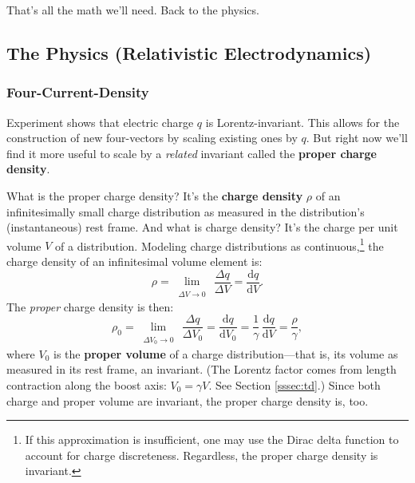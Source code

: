 \documentclass[12pt]{article}
\newcommand{\dd}[1]{\mathrm{d}#1}
\begin{document}
That's all the math we'll need. Back to the physics.



\subsection{The Physics (Relativistic Electrodynamics)}

\subsubsection{Four-Current-Density}

Experiment shows that electric charge $q$ is Lorentz-invariant. This allows for the construction of new four-vectors by scaling existing ones by $q$. But right now we'll find it more useful to scale by a \emph{related} invariant called the \textbf{proper charge density}.

What is the proper charge density? It's the \textbf{charge density} $\rho$ of an infinitesimally small charge distribution as measured in the distribution's (instantaneous) rest frame. And what is charge density? It's the charge per unit volume $V$ of a distribution. Modeling charge distributions as continuous,\footnote{If this approximation is insufficient, one may use the Dirac delta function to account for charge discreteness. Regardless, the proper charge density is invariant.} the charge density of an infinitesimal volume element is:
\begin{equation*}
\rho = \lim\limits_{\substack{\\ \Delta V \to 0}} \, \dfrac{\Delta q}{\Delta V} = \dfrac{\dd q}{\dd V} .
\end{equation*}
The \emph{proper} charge density is then:
\begin{equation*}
\rho_0 = \lim\limits_{\substack{\\ \Delta V_0 \to 0}} \, \dfrac{\Delta q}{\Delta V_0} = \dfrac{\dd q}{\dd V_0} = \dfrac{1}{\gamma} \, \dfrac{\dd q}{\dd V} = \dfrac{\rho}{\gamma},
\end{equation*}
where $V_0$ is the \textbf{proper volume} of a charge distribution---that is, its volume as measured in its rest frame, an invariant. (The Lorentz factor comes from length contraction along the boost axis: $V_0 = \gamma V$. See Section \ref{sssec:td}.) Since both charge and proper volume are invariant, the proper charge density is, too.
\end{document}
